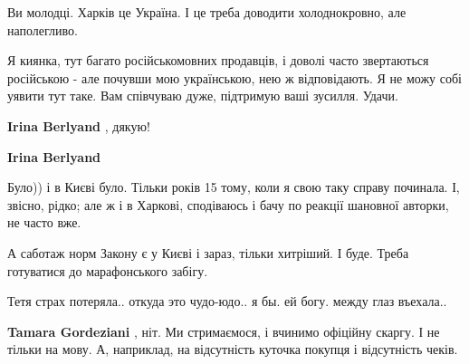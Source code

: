 \begin{itemize}
\begin{itemize}
Ви молодці. Харків це Україна. І це треба доводити холоднокровно, але наполегливо.

Я киянка, тут багато російськомовних продавців, і доволі часто звертаються
російською - але почувши мою українською, нею ж відповідають. Я не можу собі
уявити тут таке. Вам співчуваю дуже, підтримую ваші зусилля. Удачи.


 
\textbf{Irina Berlyand} , дякую!

 
\textbf{Irina Berlyand}

Було)) і в Києві було. Тільки років 15 тому, коли я свою таку справу починала.
І, звісно, рідко; але ж і в Харкові, сподіваюсь і бачу по реакції шановної
авторки, не часто вже.

А саботаж норм Закону є у Києві і зараз, тільки хитріший. І буде. Треба
готуватися до марафонського забігу.

\end{itemize}

 
Тетя страх потеряла.. откуда это чудо-юдо.. я бы. ей богу. между глаз въехала..

\begin{itemize}
 
\textbf{Tamara Gordeziani} , ніт. Ми стримаємося, і вчинимо офіційну скаргу. І не тільки на мову. А, наприклад, на відсутність куточка покупця і відсутність чеків.

 

\end{itemize}
\end{itemize}
